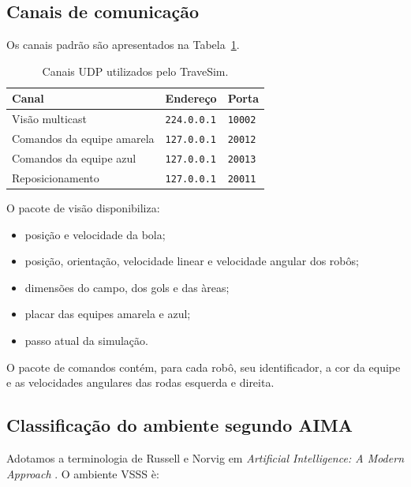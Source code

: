 \documentclass[12pt,a4paper]{article}
\begin{document}
\subsection{Canais de comunica\c{c}\~ao}

Os canais padr\~ao s\~ao apresentados na Tabela~\ref{tab:travesim-udp}.

\begin{table}[ht]
\centering
\caption{Canais UDP utilizados pelo TraveSim.}
\label{tab:travesim-udp}
\begin{tabular}{lll}
\toprule
Canal & Endere\c{c}o & Porta \\
\midrule
Vis\~ao multicast & \texttt{224.0.0.1} & \texttt{10002} \\
Comandos da equipe amarela & \texttt{127.0.0.1} & \texttt{20012} \\
Comandos da equipe azul & \texttt{127.0.0.1} & \texttt{20013} \\
Reposicionamento & \texttt{127.0.0.1} & \texttt{20011} \\
\bottomrule
\end{tabular}
\end{table}

O pacote de vis\~ao disponibiliza:

\begin{itemize}
  \item posi\c{c}\~ao e velocidade da bola;
  \item posi\c{c}\~ao, orienta\c{c}\~ao, velocidade linear e velocidade angular dos rob\^os;
  \item dimens\~oes do campo, dos gols e das \`areas;
  \item placar das equipes amarela e azul;
  \item passo atual da simula\c{c}\~ao.
\end{itemize}

O pacote de comandos cont\'em, para cada rob\^o, seu identificador, a cor da equipe e as velocidades angulares das rodas esquerda e direita.

\subsection{Classifica\c{c}\~ao do ambiente segundo AIMA}

Adotamos a terminologia de Russell e Norvig em \textit{Artificial Intelligence: A Modern Approach} \cite{russellnorvig2021}. O ambiente VSSS \`e:
\end{document}
